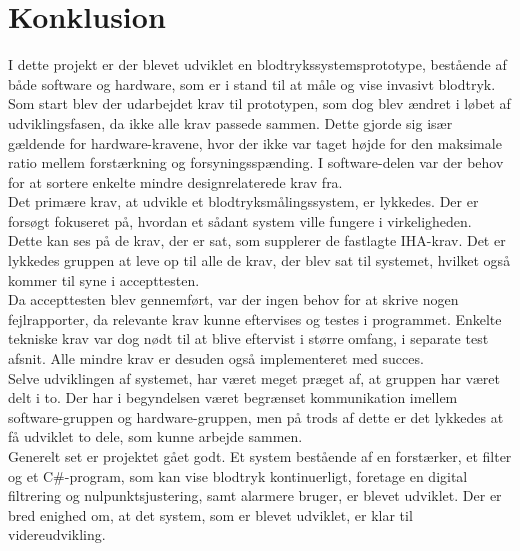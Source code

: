 \chapter{Konklusion}
I dette projekt er der blevet udviklet en blodtrykssystemsprototype, bestående af både software og hardware, som er i stand til at måle og vise invasivt blodtryk. \\[2ex]
Som start blev der udarbejdet krav til prototypen, som dog blev ændret i løbet af udviklingsfasen, da ikke alle krav passede sammen. Dette gjorde sig især gældende for hardware-kravene, hvor der ikke var taget højde for den maksimale ratio mellem forstærkning og forsyningsspænding. I software-delen var der behov for at sortere enkelte mindre designrelaterede krav fra.\\[2ex]
Det primære krav, at udvikle et blodtryksmålingssystem, er lykkedes. Der er forsøgt fokuseret på, hvordan et sådant system ville fungere i virkeligheden.\\ Dette kan ses på de krav, der er sat, som supplerer de fastlagte IHA-krav. Det er lykkedes gruppen at leve op til alle de krav, der blev sat til systemet, hvilket også kommer til syne i accepttesten. \\[2ex]
Da accepttesten blev gennemført, var der ingen behov for at skrive nogen fejlrapporter, da relevante krav kunne eftervises og testes i programmet. Enkelte tekniske krav var dog nødt til at blive eftervist i større omfang, i separate test afsnit. Alle mindre krav er desuden også implementeret med succes.\\[2ex]
Selve udviklingen af systemet, har været meget præget af, at gruppen har været delt i to. Der har i begyndelsen været begrænset kommunikation imellem software-gruppen og hardware-gruppen, men på trods af dette er det lykkedes at få udviklet to dele, som kunne arbejde sammen. \\[2ex]
Generelt set er projektet gået godt. Et system bestående af en forstærker, et filter og et C\#-program, som kan vise blodtryk kontinuerligt, foretage en digital filtrering og nulpunktsjustering, samt alarmere bruger, er blevet udviklet. Der er bred enighed om, at det system, som er blevet udviklet, er klar til videreudvikling.


